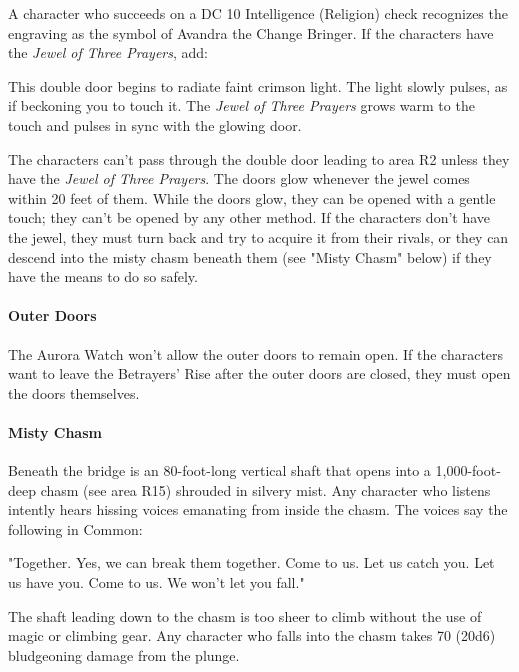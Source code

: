 \documentclass[a4paper, 11pt, bg=full, twocolumn, nooutline]{dndbook}
\begin{document}
A character who succeeds on a DC 10 Intelligence (Religion) check recognizes the engraving as the symbol of Avandra the Change Bringer. If the characters have the \textit{Jewel of Three Prayers}, add:

\begin{DndReadAloud}
This double door begins to radiate faint crimson light. The light slowly pulses, as if beckoning you to touch it. The \textit{Jewel of Three Prayers} grows warm to the touch and pulses in sync with the glowing door.
\end{DndReadAloud}

The characters can't pass through the double door leading to area R2 unless they have the \textit{Jewel of Three Prayers}. The doors glow whenever the jewel comes within 20 feet of them. While the doors glow, they can be opened with a gentle touch; they can't be opened by any other method. If the characters don't have the jewel, they must turn back and try to acquire it from their rivals, or they can descend into the misty chasm beneath them (see "Misty Chasm" below) if they have the means to do so safely.

\paragraph{Outer Doors}

The Aurora Watch won't allow the outer doors to remain open. If the characters want to leave the Betrayers' Rise after the outer doors are closed, they must open the doors themselves.

\paragraph{Misty Chasm}

Beneath the bridge is an 80-foot-long vertical shaft that opens into a 1,000-foot-deep chasm (see area R15) shrouded in silvery mist. Any character who listens intently hears hissing voices emanating from inside the chasm. The voices say the following in Common:

\begin{DndReadAloud}
"Together. Yes, we can break them together. Come to us. Let us catch you. Let us have you. Come to us. We won't let you fall."
\end{DndReadAloud}

The shaft leading down to the chasm is too sheer to climb without the use of magic or climbing gear. Any character who falls into the chasm takes 70 (20d6) bludgeoning damage from the plunge.
\end{document}
